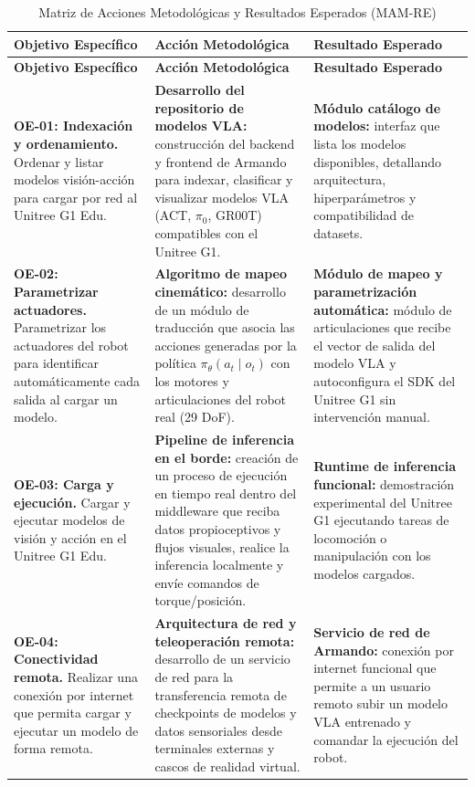 \documentclass[stu,12pt,floatsintext]{apa7}
\begin{document}
\begin{longtable}{|p{3.6cm}|p{5.4cm}|p{5.4cm}|}
\caption{Matriz de Acciones Metodológicas y Resultados Esperados (MAM-RE)}
\label{tab:mam-re}\\
\hline
\rowcolor{gray!20}
\textbf{Objetivo Específico} & \textbf{Acción Metodológica} & \textbf{Resultado Esperado} \\
\hline
\endfirsthead
\hline
\rowcolor{gray!20}
\textbf{Objetivo Específico} & \textbf{Acción Metodológica} & \textbf{Resultado Esperado} \\
\hline
\endhead

\textbf{OE-01: Indexación y ordenamiento.} Ordenar y listar modelos visión-acción para cargar por red al Unitree G1 Edu. &
\textbf{Desarrollo del repositorio de modelos VLA:} construcción del backend y frontend de Armando para indexar, clasificar y visualizar modelos VLA (ACT, $\pi_0$, GR00T) compatibles con el Unitree G1. &
\textbf{Módulo catálogo de modelos:} interfaz que lista los modelos disponibles, detallando arquitectura, hiperparámetros y compatibilidad de datasets. \\
\hline

\textbf{OE-02: Parametrizar actuadores.} Parametrizar los actuadores del robot para identificar automáticamente cada salida al cargar un modelo. &
\textbf{Algoritmo de mapeo cinemático:} desarrollo de un módulo de traducción que asocia las acciones generadas por la política $\pi_{\theta}(a_t \mid o_t)$ con los motores y articulaciones del robot real (29 DoF). &
\textbf{Módulo de mapeo y parametrización automática:} módulo de articulaciones que recibe el vector de salida del modelo VLA y autoconfigura el SDK del Unitree G1 sin intervención manual. \\
\hline

\textbf{OE-03: Carga y ejecución.} Cargar y ejecutar modelos de visión y acción en el Unitree G1 Edu. &
\textbf{Pipeline de inferencia en el borde:} creación de un proceso de ejecución en tiempo real dentro del middleware que reciba datos propioceptivos y flujos visuales, realice la inferencia localmente y envíe comandos de torque/posición. &
\textbf{Runtime de inferencia funcional:} demostración experimental del Unitree G1 ejecutando tareas de locomoción o manipulación con los modelos cargados. \\
\hline

\textbf{OE-04: Conectividad remota.} Realizar una conexión por internet que permita cargar y ejecutar un modelo de forma remota. &
\textbf{Arquitectura de red y teleoperación remota:} desarrollo de un servicio de red para la transferencia remota de checkpoints de modelos y datos sensoriales desde terminales externas y cascos de realidad virtual. &
\textbf{Servicio de red de Armando:} conexión por internet funcional que permite a un usuario remoto subir un modelo VLA entrenado y comandar la ejecución del robot. \\
\hline


\end{longtable}
\end{document}
